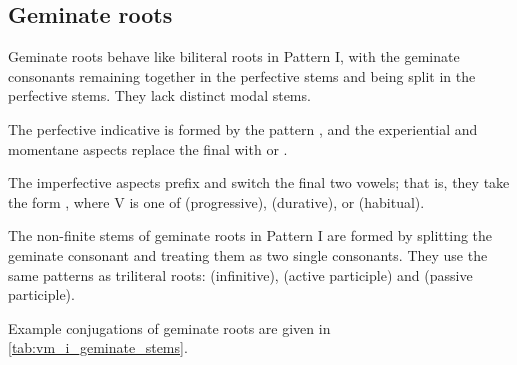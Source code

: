 \documentclass[grammar]{subfiles}
\begin{document}
\subsection{Geminate roots}
\label{ssec:vm_i_geminate_roots}

Geminate roots behave like biliteral roots in Pattern I, with the geminate
consonants remaining together in the perfective stems and being split in the
perfective stems.  They lack distinct modal stems. 

The perfective indicative is formed by the pattern , and the
experiential and momentane aspects replace the final  with
 or .

The imperfective aspects prefix  and switch the final two vowels;
that is, they take the form , where V is one of
 (progressive),  (durative), or 
(habitual).


The non-finite stems of geminate roots in Pattern I are formed by splitting the
geminate consonant and treating them as two single consonants.  They use the
same patterns as triliteral roots:   (infinitive),
 (active participle) and  (passive
participle). 

Example conjugations of geminate roots are given in
\cref{tab:vm_i_geminate_stems}.


\begin{table}[h!]\small\capstart
  \centering
  \\
  \caption{Pattern I geminate stems \label{tab:vm_i_geminate_stems}}
\end{table}
\end{document}
